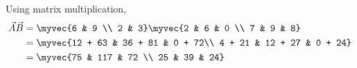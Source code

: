 Using matrix multiplication,
\begin{align}
    \vec{A}\vec{B} &= \myvec{6 & 9 \\ 2 & 3}\myvec{2 & 6 & 0 \\ 7 & 9 & 8}\\
    &= \myvec{12 + 63 & 36 + 81 & 0 + 72\\ 4 + 21 & 12 + 27 & 0 + 24}\\
    &= \myvec{75 & 117 & 72 \\ 25 & 39 & 24}
\end{align}